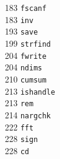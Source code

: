 \begin{footnotesize}
\begin{multicols}{3}
\vspace{-.153cm} 183   \hspace{.2cm} {\tt fscanf              }     \\ %
\vspace{-.153cm} 183   \hspace{.2cm} {\tt inv                 }     \\ %
\vspace{-.153cm} 193   \hspace{.2cm} {\tt save                }     \\ %
\vspace{-.153cm} 199   \hspace{.2cm} {\tt strfind             }     \\ %
\vspace{-.153cm} 204   \hspace{.2cm} {\tt fwrite              }     \\ %
\vspace{-.153cm} 204   \hspace{.2cm} {\tt ndims               }     \\ %
\vspace{-.153cm} 210   \hspace{.2cm} {\tt cumsum              }     \\ %
\vspace{-.153cm} 213   \hspace{.2cm} {\tt ishandle            }     \\ %
\vspace{-.153cm} 213   \hspace{.2cm} {\tt rem                 }     \\ %
\vspace{-.153cm} 214   \hspace{.2cm} {\tt nargchk             }     \\ %
\vspace{-.153cm} 222   \hspace{.2cm} {\tt fft                 }     \\ %
\vspace{-.153cm} 228   \hspace{.2cm} {\tt sign                }     \\ %
\vspace{-.153cm} 228   \hspace{.2cm} {\tt cd                  }     \\ %

\end{multicols}
\end{footnotesize}
